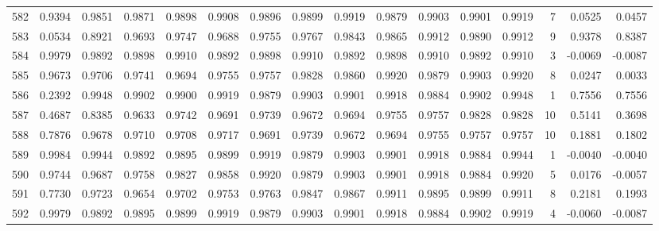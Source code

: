 \begin{tabular}{lrrrrrrrrrrrrrrr}
582 &      0.9394 &  0.9851 &  0.9871 &  0.9898 &  0.9908 &  0.9896 &  0.9899 &  0.9919 &  0.9879 &  0.9903 &   0.9901 &     0.9919 &      7 &                    0.0525 &                     0.0457 \\
583 &      0.0534 &  0.8921 &  0.9693 &  0.9747 &  0.9688 &  0.9755 &  0.9767 &  0.9843 &  0.9865 &  0.9912 &   0.9890 &     0.9912 &      9 &                    0.9378 &                     0.8387 \\
584 &      0.9979 &  0.9892 &  0.9898 &  0.9910 &  0.9892 &  0.9898 &  0.9910 &  0.9892 &  0.9898 &  0.9910 &   0.9892 &     0.9910 &      3 &                   -0.0069 &                    -0.0087 \\
585 &      0.9673 &  0.9706 &  0.9741 &  0.9694 &  0.9755 &  0.9757 &  0.9828 &  0.9860 &  0.9920 &  0.9879 &   0.9903 &     0.9920 &      8 &                    0.0247 &                     0.0033 \\
586 &      0.2392 &  0.9948 &  0.9902 &  0.9900 &  0.9919 &  0.9879 &  0.9903 &  0.9901 &  0.9918 &  0.9884 &   0.9902 &     0.9948 &      1 &                    0.7556 &                     0.7556 \\
587 &      0.4687 &  0.8385 &  0.9633 &  0.9742 &  0.9691 &  0.9739 &  0.9672 &  0.9694 &  0.9755 &  0.9757 &   0.9828 &     0.9828 &     10 &                    0.5141 &                     0.3698 \\
588 &      0.7876 &  0.9678 &  0.9710 &  0.9708 &  0.9717 &  0.9691 &  0.9739 &  0.9672 &  0.9694 &  0.9755 &   0.9757 &     0.9757 &     10 &                    0.1881 &                     0.1802 \\
589 &      0.9984 &  0.9944 &  0.9892 &  0.9895 &  0.9899 &  0.9919 &  0.9879 &  0.9903 &  0.9901 &  0.9918 &   0.9884 &     0.9944 &      1 &                   -0.0040 &                    -0.0040 \\
590 &      0.9744 &  0.9687 &  0.9758 &  0.9827 &  0.9858 &  0.9920 &  0.9879 &  0.9903 &  0.9901 &  0.9918 &   0.9884 &     0.9920 &      5 &                    0.0176 &                    -0.0057 \\
591 &      0.7730 &  0.9723 &  0.9654 &  0.9702 &  0.9753 &  0.9763 &  0.9847 &  0.9867 &  0.9911 &  0.9895 &   0.9899 &     0.9911 &      8 &                    0.2181 &                     0.1993 \\
592 &      0.9979 &  0.9892 &  0.9895 &  0.9899 &  0.9919 &  0.9879 &  0.9903 &  0.9901 &  0.9918 &  0.9884 &   0.9902 &     0.9919 &      4 &                   -0.0060 &                    -0.0087 \\

\end{tabular}

